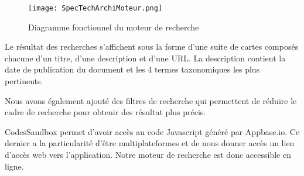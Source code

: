 \begin{figure}[h!]
  \centering
	\texttt{[image: SpecTechArchiMoteur.png]}
	\caption[]{Diagramme fonctionnel du moteur de recherche}
  \label{}
\end{figure}

Le résultat des recherches s'affichent sous la forme d'une suite de cartes composés chacune d’un titre, d’une description et d’une URL\@.
La description contient la date de publication du document et les 4 termes taxonomiques les plus pertinents.

Nous avons également ajouté des filtres de recherche qui permettent de réduire le cadre de recherche pour obtenir des résultat plus précis.

CodesSandbox permet d’avoir accès au code Javascript généré par Appbase.io.
Ce dernier a la particularité d’être multiplateformes et de nous donner accès un lien d’accès web vers l'application.
Notre moteur de recherche est donc accessible en ligne.
